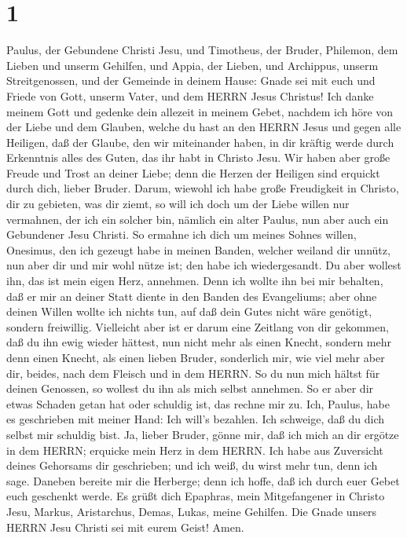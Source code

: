 \hypertarget{section}{%
\section{1}\label{section}}

 Paulus, der Gebundene Christi Jesu, und Timotheus, der
Bruder, Philemon, dem Lieben und unserm Gehilfen,  und
Appia, der Lieben, und Archippus, unserm Streitgenossen, und der
Gemeinde in deinem Hause:  Gnade sei mit euch und Friede von
Gott, unserm Vater, und dem HERRN Jesus Christus!  Ich danke
meinem Gott und gedenke dein allezeit in meinem Gebet, 
nachdem ich höre von der Liebe und dem Glauben, welche du hast an den
HERRN Jesus und gegen alle Heiligen,  daß der Glaube, den
wir miteinander haben, in dir kräftig werde durch Erkenntnis alles des
Guten, das ihr habt in Christo Jesu.  Wir haben aber große
Freude und Trost an deiner Liebe; denn die Herzen der Heiligen sind
erquickt durch dich, lieber Bruder.  Darum, wiewohl ich habe
große Freudigkeit in Christo, dir zu gebieten, was dir ziemt,
 so will ich doch um der Liebe willen nur vermahnen, der ich
ein solcher bin, nämlich ein alter Paulus, nun aber auch ein Gebundener
Jesu Christi.  So ermahne ich dich um meines Sohnes willen,
Onesimus, den ich gezeugt habe in meinen Banden,  welcher
weiland dir unnütz, nun aber dir und mir wohl nütze ist; den habe ich
wiedergesandt.  Du aber wollest ihn, das ist mein eigen
Herz, annehmen.  Denn ich wollte ihn bei mir behalten, daß
er mir an deiner Statt diente in den Banden des Evangeliums;
 aber ohne deinen Willen wollte ich nichts tun, auf daß
dein Gutes nicht wäre genötigt, sondern freiwillig. 
Vielleicht aber ist er darum eine Zeitlang von dir gekommen, daß du ihn
ewig wieder hättest,  nun nicht mehr als einen Knecht,
sondern mehr denn einen Knecht, als einen lieben Bruder, sonderlich mir,
wie viel mehr aber dir, beides, nach dem Fleisch und in dem HERRN.
 So du nun mich hältst für deinen Genossen, so wollest du
ihn als mich selbst annehmen.  So er aber dir etwas Schaden
getan hat oder schuldig ist, das rechne mir zu.  Ich,
Paulus, habe es geschrieben mit meiner Hand: Ich will's bezahlen. Ich
schweige, daß du dich selbst mir schuldig bist.  Ja, lieber
Bruder, gönne mir, daß ich mich an dir ergötze in dem HERRN; erquicke
mein Herz in dem HERRN.  Ich habe aus Zuversicht deines
Gehorsams dir geschrieben; und ich weiß, du wirst mehr tun, denn ich
sage.  Daneben bereite mir die Herberge; denn ich hoffe,
daß ich durch euer Gebet euch geschenkt werde.  Es grüßt
dich Epaphras, mein Mitgefangener in Christo Jesu,  Markus,
Aristarchus, Demas, Lukas, meine Gehilfen.  Die Gnade
unsers HERRN Jesu Christi sei mit eurem Geist! Amen.
